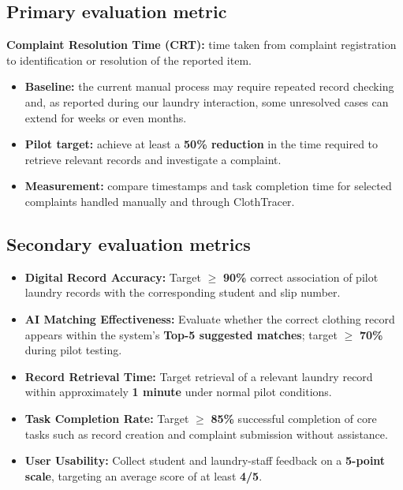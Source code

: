 \documentclass[11pt,a4paper]{article}
\begin{document}
\subsection{Primary evaluation metric}

\textbf{Complaint Resolution Time (CRT):} time taken from complaint registration to identification or resolution of the reported item.

\begin{itemize}[leftmargin=0.7cm]
    \item \textbf{Baseline:} the current manual process may require repeated record checking and, as reported during our laundry interaction, some unresolved cases can extend for weeks or even months.
    \item \textbf{Pilot target:} achieve at least a \textbf{50\% reduction} in the time required to retrieve relevant records and investigate a complaint.
    \item \textbf{Measurement:} compare timestamps and task completion time for selected complaints handled manually and through ClothTracer.
\end{itemize}

\subsection{Secondary evaluation metrics}

\begin{itemize}[leftmargin=0.7cm]

    \item \textbf{Digital Record Accuracy:}
    Target $\geq$ \textbf{90\%} correct association of pilot laundry records with the corresponding student and slip number.

    \item \textbf{AI Matching Effectiveness:}
    Evaluate whether the correct clothing record appears within the system's \textbf{Top-5 suggested matches}; target $\geq$ \textbf{70\%} during pilot testing.

    \item \textbf{Record Retrieval Time:}
    Target retrieval of a relevant laundry record within approximately \textbf{1 minute} under normal pilot conditions.

    \item \textbf{Task Completion Rate:}
    Target $\geq$ \textbf{85\%} successful completion of core tasks such as record creation and complaint submission without assistance.

    \item \textbf{User Usability:}
    Collect student and laundry-staff feedback on a \textbf{5-point scale}, targeting an average score of at least \textbf{4/5}.

\end{itemize}
\end{document}
